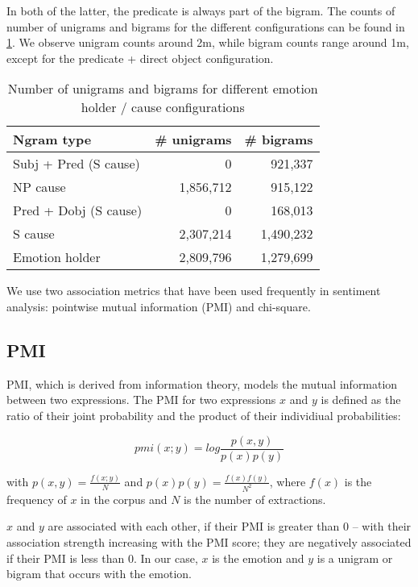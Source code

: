In both of the latter, the predicate is always part of the bigram. The counts of number of unigrams and bigrams for the different configurations can be found in \ref{tab:unigram_bigram_count_ngram_type}. We observe unigram counts around 2m, while bigram counts range around 1m, except for the predicate + direct object configuration.

\begin{table}[h]
\centering
\begin{tabular}{l|r|r}
{\bf Ngram type}      & {\bf \# unigrams} & {\bf \# bigrams} \\\hline
Subj + Pred (S cause) & 0                 & 921,337          \\
NP cause              & 1,856,712         & 915,122          \\
Pred + Dobj (S cause) & 0                 & 168,013          \\
S cause               & 2,307,214         & 1,490,232        \\
Emotion holder        & 2,809,796         & 1,279,699       
\end{tabular}
\caption{Number of unigrams and bigrams for different emotion holder / cause configurations}
\label{tab:unigram_bigram_count_ngram_type}
\end{table}

We use two association metrics that have been used frequently in sentiment analysis: pointwise mutual information (PMI) and chi-square.

\subsection{PMI}

PMI, which is derived from information theory, models the mutual information between two expressions. The PMI for two expressions $x$ and $y$ is defined as the ratio of their joint probability and the product of their individiual probabilities:

$$pmi(x;y) = log \dfrac{p(x,y)}{p(x)p(y)}$$

with $p(x,y) = \frac{f(x;y)}{N}$ and $p(x)p(y) = \frac{f(x)f(y)}{N^{2}}$, where $f(x)$ is the frequency of $x$ in the corpus and $N$ is the number of extractions.

$x$ and $y$ are associated with each other, if their PMI is greater than 0 -- with their association strength increasing with the PMI score; they are negatively associated if their PMI is less than 0.
In our case, $x$ is the emotion and $y$ is a unigram or bigram that occurs with the emotion.

